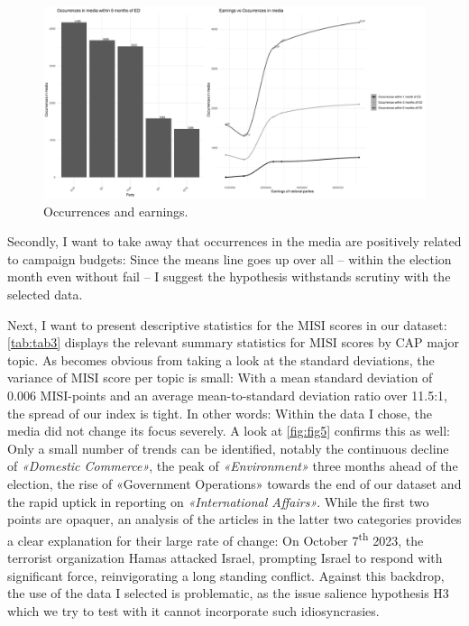 \documentclass[11pt,a4paper]{article}
\begin{document}
\begin{figure}
    \centering
    \includegraphics[width=1\linewidth]{output/plots/plot_figure_4.png}
    \caption{Occurrences and earnings.}
    \label{fig:fig4}
\end{figure}

Secondly, I want to take away that occurrences in the media are positively related to campaign budgets: Since the means line goes up over all – within the election month even without fail – I suggest the hypothesis withstands scrutiny with the selected data.

Next, I want to present descriptive statistics for the MISI scores in our dataset: \autoref{tab:tab3} displays the relevant summary statistics for MISI scores by CAP major topic. As becomes obvious from taking a look at the standard deviations, the variance of MISI score per topic is small: With a mean standard deviation of 0.006 MISI-points and an average mean-to-standard deviation ratio over 11.5:1, the spread of our index is tight. In other words: Within the data I chose, the media did not change its focus severely. A look at \autoref{fig:fig5} confirms this as well: Only a small number of trends can be identified, notably the continuous decline of \textit{«Domestic Commerce»}, the peak of \textit{«Environment»} three months ahead of the election, the rise of «Government Operations» towards the end of our dataset and the rapid uptick in reporting on \textit{«International Affairs»}. While the first two points are opaquer, an analysis of the articles in the latter two categories provides a clear explanation for their large rate of change: On October 7\textsuperscript{th} 2023, the terrorist organization Hamas attacked Israel, prompting Israel to respond with significant force, reinvigorating a long standing conflict. Against this backdrop, the use of the data I selected is problematic, as the issue salience hypothesis H3 which we try to test with it cannot incorporate such idiosyncrasies.
\end{document}
